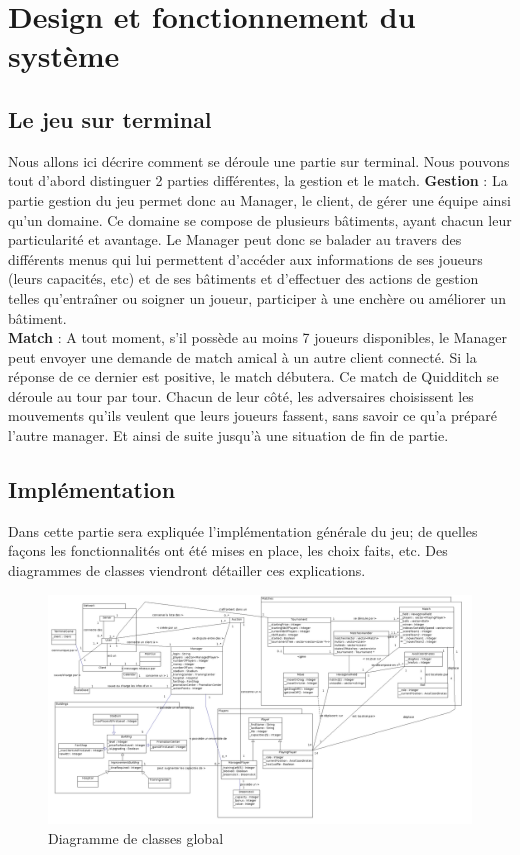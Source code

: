 \documentclass[a4paper,titlepage]{scrreprt}
\begin{document}
\section{Design et fonctionnement du système}
  \subsection{Le jeu sur terminal}
Nous allons ici décrire comment se déroule une partie sur terminal. Nous pouvons tout d'abord distinguer 2 parties différentes, la gestion et le match.
\textbf{Gestion} : La partie gestion du jeu permet donc au Manager, le client, de gérer une équipe ainsi qu'un domaine. Ce domaine se compose de plusieurs bâtiments, ayant chacun leur particularité et avantage. Le Manager peut donc se balader au travers des différents menus qui lui permettent d'accéder aux informations de ses joueurs (leurs capacités, etc) et de ses bâtiments et d'effectuer des actions de gestion telles qu'entraîner ou soigner un joueur, participer à une enchère ou améliorer un bâtiment. \\
\textbf{Match} : A tout moment, s'il possède au moins 7 joueurs disponibles, le Manager peut envoyer une demande de match amical à un autre client connecté. Si la réponse de ce dernier est positive, le match débutera. Ce match de Quidditch se déroule au tour par tour. Chacun de leur côté, les adversaires choisissent les mouvements qu'ils veulent que leurs joueurs fassent, sans savoir ce qu'a préparé l'autre manager. Et ainsi de suite jusqu'à une situation de fin de partie. \\

  \subsection{Implémentation}
  
  Dans cette partie sera expliquée l'implémentation générale du jeu; de quelles façons les fonctionnalités ont été mises en place, les choix faits, etc. Des diagrammes de classes viendront détailler ces explications.
    \begin{landscape} %
    \begin{figure}[H]
      \includegraphics[scale=0.35]{uml/class/Global.png}%
      \caption{Diagramme de classes global}
    \end{figure}
    \end{landscape}
\end{document}
